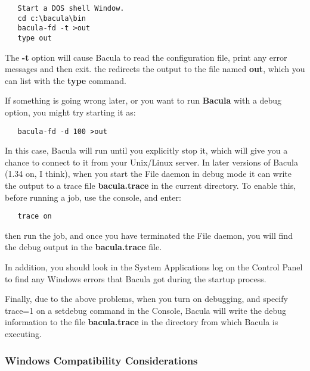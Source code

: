 \footnotesize
\begin{verbatim}
   Start a DOS shell Window.
   cd c:\bacula\bin
   bacula-fd -t >out
   type out
\end{verbatim}
\normalsize

The {\bf -t} option will cause Bacula to read the configuration file, print
any error messages and then exit. the {\bf \gt{}} redirects the output to the
file named {\bf out}, which you can list with the {\bf type} command. 

If something is going wrong later, or you want to run {\bf Bacula} with a
debug option, you might try starting it as: 

\footnotesize
\begin{verbatim}
   bacula-fd -d 100 >out
\end{verbatim}
\normalsize

In this case, Bacula will run until you explicitly stop it, which will give
you a chance to connect to it from your Unix/Linux server. In later versions
of Bacula (1.34 on, I think), when you start the File daemon in debug mode it
can write the output to a trace file {\bf bacula.trace} in the current
directory. To enable this, before running a job, use the console, and enter: 

\footnotesize
\begin{verbatim}
   trace on
\end{verbatim}
\normalsize

then run the job, and once you have terminated the File daemon, you will find
the debug output in the {\bf bacula.trace} file. 

In addition, you should look in the System Applications log on the Control
Panel to find any Windows errors that Bacula got during the startup process. 

Finally, due to the above problems, when you turn on debugging, and specify
trace=1 on a setdebug command in the Console, Bacula will write the debug
information to the file {\bf bacula.trace} in the directory from which Bacula
is executing. 

\label{Compatibility}

\subsubsection*{Windows Compatibility Considerations}


